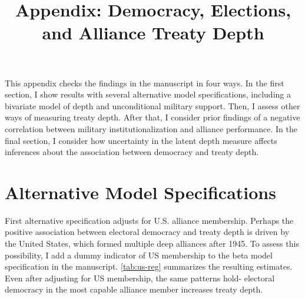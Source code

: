 \documentclass[12pt]{article}
\title{\textbf{Appendix: Democracy, Elections, and Alliance Treaty Depth}}
\author{}
\date{}
\begin{document}
\maketitle 

\doublespace 

This appendix checks the findings in the manuscript in four ways. 
In the first section, I show results with several alternative model specifications, including a bivariate model of depth and unconditional military support.
Then, I assess other ways of measuring treaty depth. 
After that, I consider prior findings of a negative correlation between military institutionalization and alliance performance. 
In the final section, I consider how uncertainty in the latent depth measure affects inferences about the association between democracy and treaty depth. 


\section{Alternative Model Specifications} 


First alternative specification adjusts for U.S. alliance membership. 
Perhaps the positive association between electoral democracy and treaty depth is driven by the United States, which formed multiple deep alliances after 1945. 
To assess this possibility, I add a dummy indicator of US membership to the beta model specification in the manuscript. 
\autoref{tab:us-reg} summarizes the resulting estimates. 
Even after adjusting for US membership, the same patterns hold- electoral democracy in the most capable alliance member increases treaty depth. 
 
\end{document}
